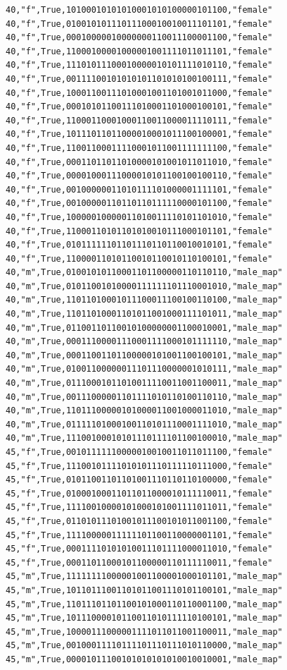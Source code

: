 \documentclass[authoryearcitations]{UoYCSproject}
\begin{document}
\begin{framed}
\begin{verbatim}
40,"f",True,10100010101010001010100000101100,"female"
40,"f",True,01001010111011100010010011101101,"female"
40,"f",True,00010000010000000110011100001100,"female"
40,"f",True,11000100001000001001111011011101,"female"
40,"f",True,11101011100010000010101111010110,"female"
40,"f",True,00111100101010101101010100100111,"female"
40,"f",True,10001100111010001001101001011000,"female"
40,"f",True,00010101100111010001101000100101,"female"
40,"f",True,11000110001000110011000011110111,"female"
40,"f",True,10111011011000010001011100100001,"female"
40,"f",True,11001100011110001011001111111100,"female"
40,"f",True,00011011011010000101001011011010,"female"
40,"f",True,00001000111000010101100100100110,"female"
40,"f",True,00100000011010111101000001111101,"female"
40,"f",True,00100000110110110111110000101100,"female"
40,"f",True,10000010000011010011110101101010,"female"
40,"f",True,11000110101101010010111000101101,"female"
40,"f",True,01011111101101110110110010010101,"female"
40,"f",True,11000011010110010110010110100101,"female"
40,"m",True,01001010110001101100000110110110,"male_map"
40,"m",True,01011001010000111111101110001010,"male_map"
40,"m",True,11011010001011100011100100110100,"male_map"
40,"m",True,11011010001101011001000111101011,"male_map"
40,"m",True,01100110110010100000001100010001,"male_map"
40,"m",True,00011100001110001111000101111110,"male_map"
40,"m",True,00011001101100000101001100100101,"male_map"
40,"m",True,01001100000011101110000001010111,"male_map"
40,"m",True,01110001011010011110011001100011,"male_map"
40,"m",True,00111000001101111010110100110110,"male_map"
40,"m",True,11011100000101000011001000011010,"male_map"
40,"m",True,01111101000100110101110001111010,"male_map"
40,"m",True,11100100010101110111101100100010,"male_map"
45,"f",True,00101111110000010010011011011100,"female"
45,"f",True,11100101111010101110111110111000,"female"
45,"f",True,01011001101101001110110110100000,"female"
45,"f",True,01000100011011011000010111110011,"female"
45,"f",True,11110010000101000101001111011011,"female"
45,"f",True,01101011101001011100101011001100,"female"
45,"f",True,11110000011111101100110000001101,"female"
45,"f",True,00011110101010011101111000011010,"female"
45,"f",True,00011011000101100000110111110011,"female"
45,"m",True,11111111000001001100001000101101,"male_map"
45,"m",True,10110111001101011001110101100101,"male_map"
45,"m",True,11011101101100101000110110001100,"male_map"
45,"m",True,10111000010110011010111110100101,"male_map"
45,"m",True,10000111000001111011011001100011,"male_map"
45,"m",True,00100011110111101110111010110000,"male_map"
45,"m",True,00001011100101010101010010010001,"male_map"

\end{verbatim}
\end{framed}
\end{document}
